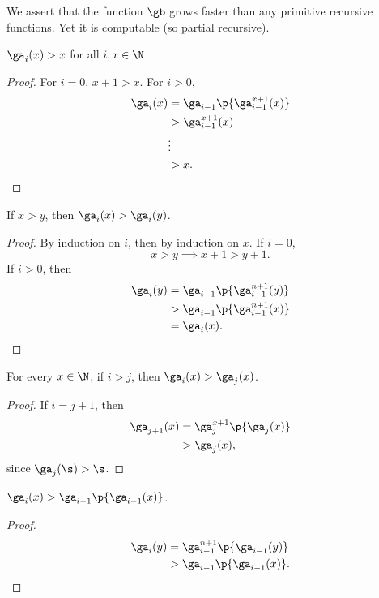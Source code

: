 We assert that the function $\gb$ grows faster than any primitive recursive functions. Yet it is computable (so partial recursive).

\begin{lemma}
  $\ga_i(x) > x$ for all $i, x \in \N$.
\end{lemma}

\begin{proof}
  For $i = 0$, $x+1 > x$. For $i> 0$,
  \begin{align*}
    \ga_i(x) &= \ga_{i-1}\p{\ga_{i-1}^{x+1}(x)} \\
    &> \ga_{i-1}^{x+1}(x) \\
    &\vdots \\
    &> x.
  \end{align*}
\end{proof}

\begin{lemma}
  If $x > y$, then $\ga_i(x) > \ga_i(y)$.
\end{lemma}

\begin{proof}
  By induction on $i$, then by induction on $x$.
  If $i = 0$,
  $$ x > y \implies x+1 > y+1. $$
  If $i > 0$, then
  \begin{align*}
    \ga_i(y)
    &= \ga_{i-1}\p{\ga_{i-1}^{n+1}(y)} \\
    &> \ga_{i-1}\p{\ga_{i-1}^{n+1}(x)} \\
    &= \ga_i(x).
  \end{align*}
\end{proof}

\begin{lemma}
  For every $x \in \N$, if $i > j$, then $\ga_i(x) > \ga_j(x)$.
\end{lemma}

\begin{proof}
  If $i = j+1$, then
  \begin{align*}
    \ga_{j+1}(x)
    &= \ga_j^{x+1}\p{\ga_j(x)} \\
    &> \ga_j(x),
  \end{align*}
  since $\ga_j(\s) > \s$.
\end{proof}

\begin{lemma}
  $\ga_i(x) > \ga_{i-1}\p{\ga_{i-1}(x)}$.
\end{lemma}

\begin{proof}
  \begin{align*}
    \ga_i(y)
    &= \ga_{i-1}^{n+1}\p{\ga_{i-1}(y)} \\
    &> \ga_{i-1}\p{\ga_{i-1}(x)}.
  \end{align*}
\end{proof}


